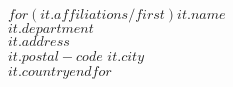 $for(it.affiliations/first)$$it.name$\\$it.department$\\$it.address$\\$it.postal-code$ $it.city$\\$it.country$$endfor$
